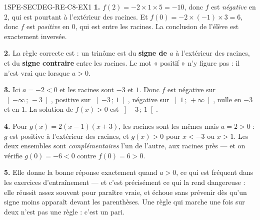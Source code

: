 \begin{corrige}{1SPE-SECDEG-RE-C8-EX1}
\textbf{1.} $f(2) = -2 \times 1 \times 5 = -10$, donc $f$ est \emph{négative} en
$2$, qui est pourtant à l'extérieur des racines. Et
$f(0) = -2 \times (-1) \times 3 = 6$, donc $f$ est \emph{positive} en $0$, qui
est entre les racines. La conclusion de l'élève est exactement inversée.

\textbf{2.} La règle correcte est : un trinôme est du \textbf{signe de $a$} à
l'extérieur des racines, et du \textbf{signe contraire} entre les racines. Le
mot « positif » n'y figure pas : il n'est vrai que lorsque $a > 0$.

\textbf{3.} Ici $a = -2 < 0$ et les racines sont $-3$ et $1$. Donc $f$ est
négative sur $\left]-\infty\,;\,-3\right[$, positive sur
$\left]-3\,;\,1\right[$, négative sur $\left]1\,;\,+\infty\right[$, nulle en
$-3$ et en $1$. La solution de $f(x) > 0$ est $\left]-3\,;\,1\right[$.

\textbf{4.} Pour $g(x) = 2(x-1)(x+3)$, les racines sont les mêmes mais
$a = 2 > 0$ : $g$ est positive à l'extérieur des racines, et
$g(x) > 0$ pour $x < -3$ ou $x > 1$. Les deux ensembles sont
\emph{complémentaires} l'un de l'autre, aux racines près — et on vérifie
$g(0) = -6 < 0$ contre $f(0) = 6 > 0$.

\textbf{5.} Elle donne la bonne réponse exactement quand $a > 0$, ce qui est
fréquent dans les exercices d'entraînement — et c'est précisément ce qui la rend
dangereuse : elle réussit assez souvent pour paraître vraie, et échoue sans
prévenir dès qu'un signe moins apparaît devant les parenthèses. Une règle qui
marche une fois sur deux n'est pas une règle : c'est un pari.
\end{corrige}
